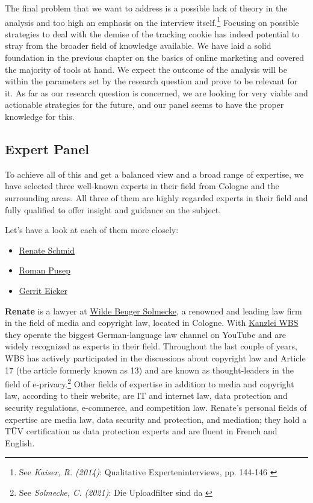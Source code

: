 The final problem that we want to address is a possible lack of theory in the analysis and too high an emphasis on the interview itself.\footnote{See \textit{Kaiser, R. (2014)}: Qualitative Experteninterviews, pp. 144-146 \cite{expertInterviews}} Focusing on possible strategies to deal with the demise of the tracking cookie has indeed potential to stray from the broader field of knowledge available. We have laid a solid foundation in the previous chapter on the basics of online marketing and covered the majority of tools at hand. We expect the outcome of the analysis will be within the parameters set by the research question and prove to be relevant for it. As far as our research question is concerned, we are looking for very viable and actionable strategies for the future, and our panel seems to have the proper knowledge for this.

\subsection{Expert Panel}

To achieve all of this and get a balanced view and a broad range of expertise, we have selected three well-known experts in their field from Cologne and the surrounding areas. All three of them are highly regarded experts in their field and fully qualified to offer insight and guidance on the subject.

Let's have a look at each of them more closely:

\begin{itemize}
 \item \href{https://www.linkedin.com/in/renate-schmid-535233113/}{Renate Schmid}
 \item \href{https://www.linkedin.com/in/roman-pusep-36b33374/}{Roman Pusep}
 \item \href{https://www.linkedin.com/in/eicker/}{Gerrit Eicker}
\end{itemize}

\textbf{Renate} is a lawyer at \href{https://www.wbs-law.de/}{Wilde Beuger Solmecke}, a renowned and leading law firm in the field of media and copyright law, located in Cologne. With \href{https://www.youtube.com/user/KanzleiWBS}{Kanzlei WBS} they operate the biggest German-language law channel on YouTube and are widely recognized as experts in their field. Throughout the last couple of years, WBS has actively participated in the discussions about copyright law and Article 17 (the article formerly known as 13) and are known as thought-leaders in the field of e-privacy.\footnote{See \textit{Solmecke, C. (2021)}: Die Uploadfilter sind da \cite{article17}} Other fields of expertise in addition to media and copyright law, according to their website, are IT and internet law, data protection and security regulations, e-commerce, and competition law. Renate's personal fields of expertise are media law, data security and protection, and mediation; they hold a TÜV certification as data protection experts and are fluent in French and English.

